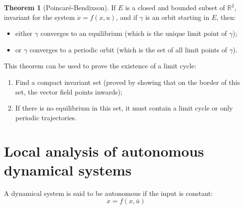 \documentclass[12pt, openany]{report}
\theoremstyle{definition}
\newtheorem{thm}{Theorem}[chapter]
\newcommand{\R}{\mathbb{R}}
\begin{document}
\begin{thm}[Poincar\'e-Bendixson]
    If \(E\) is a closed and bounded subset of \(\R^2\), invariant for the system \(\dot x=f(x,u)\), and if \(\gamma\) is an orbit starting in \(E\), then:
    \begin{itemize}
        \item either \(\gamma\) converges to an equilibrium (which is the unique limit point of \(\gamma\));
        \item or \(\gamma\) converges to a periodic orbit (which is the set of all limit points of \(\gamma\)).
    \end{itemize}
\end{thm}
This theorem can be used to prove the existence of a limit cycle:
\begin{enumerate}
    \item Find a compact invariant set (proved by showing that on the border of this set, the vector field points inwards);
    \item If there is no equilibrium in this set, it must contain a limit cycle or only periodic trajectories.
\end{enumerate}
\chapter{Local analysis of autonomous dynamical systems}
A dynamical system is said to be autonomous if the input is constant:
\begin{equation}
    \dot x= f(x,\bar u)
\end{equation}
\end{document}
